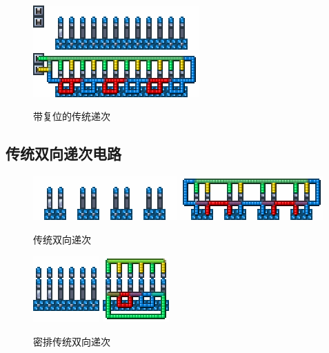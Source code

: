 \begin{figure}[!ht]
    \centering
    \includegraphics{images/106.png}
    \qquad
    \includegraphics{images/107.png}
    \caption{带复位的传统递次}
\end{figure}

\subsection{传统双向递次电路}\label{sec3}
\mbox{}
\begin{figure}[!ht]
    \centering
    \includegraphics{images/263.png}
    \qquad
    \includegraphics{images/264.png}
    \caption{传统双向递次}
\end{figure}
\begin{figure}[!ht]
    \centering
    \includegraphics{images/261.png}
    \qquad
    \includegraphics{images/262.png}
    \caption{密排传统双向递次}
\end{figure}

